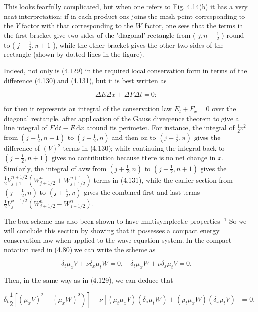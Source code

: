 \documentclass[10pt]{article}
\begin{document}
This looks fearfully complicated, but when one refers to Fig. 4.14(b) it has a very neat interpretation: if in each product one joins the mesh point corresponding to the \(V\) factor with that corresponding to the \(W\) factor, one sees that the terms in the first bracket give two sides of the 'diagonal' rectangle from ( \(j, n-\frac{1}{2}\) ) round to ( \(j+\frac{1}{2}, n+1\) ), while the other bracket gives the other two sides of the rectangle (shown by dotted lines in the figure).

Indeed, not only is (4.129) in the required local conservation form in terms of the difference (4.130) and (4.131), but it is best written as

\[
\Delta E \Delta x+\Delta F \Delta t=0:
\]

for then it represents an integral of the conservation law \(E_{t}+F_{x}=0\) over the diagonal rectangle, after application of the Gauss divergence theorem to give a line integral of \(F \mathrm{~d} t-E \mathrm{~d} x\) around its perimeter. For instance, the integral of \(\frac{1}{2} v^{2}\) from \(\left(j+\frac{1}{2}, n+1\right)\) to \(\left(j-\frac{1}{2}, n\right)\) and then on to \(\left(j+\frac{1}{2}, n\right)\) gives the difference of \((V)^{2}\) terms in (4.130); while continuing the integral back to \(\left(j+\frac{1}{2}, n+1\right)\) gives no contribution because there is no net change in \(x\). Similarly, the integral of avw from \(\left(j+\frac{1}{2}, n\right)\) to \(\left(j+\frac{1}{2}, n+1\right)\) gives the \(\frac{1}{2} V_{j+1}^{n+1 / 2}\left(W_{j+1 / 2}^{n}+W_{j+1 / 2}^{n+1}\right)\) terms in (4.131), while the earlier section from \(\left(j-\frac{1}{2}, n\right)\) to \(\left(j+\frac{1}{2}, n\right)\) gives the combined first and last terms \(\frac{1}{2} V_{j}^{n-1 / 2}\left(W_{j+1 / 2}^{n}-W_{j-1 / 2}^{n}\right)\).

The box scheme has also been shown to have multisymplectic properties. \({ }^{1}\) So we will conclude this section by showing that it possesses a compact energy conservation law when applied to the wave equation system. In the compact notation used in (4.80) we can write the scheme as

\[
\delta_{t} \mu_{x} V+\nu \delta_{x} \mu_{t} W=0, \quad \delta_{t} \mu_{x} W+\nu \delta_{x} \mu_{t} V=0 .
\]

Then, in the same way as in (4.129), we can deduce that

\[
\left.\delta_{t} \frac{1}{2}\left[\left(\mu_{x} V\right)^{2}+\left(\mu_{x} W\right)^{2}\right)\right]+\nu\left[\left(\mu_{t} \mu_{x} V\right)\left(\delta_{x} \mu_{t} W\right)+\left(\mu_{t} \mu_{x} W\right)\left(\delta_{x} \mu_{t} V\right)\right]=0 .
\]
\end{document}
